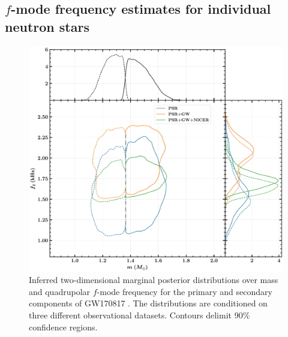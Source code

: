 \documentclass[aps,prd,twocolumn,superscriptaddress,footinbib]{revtex4-1}
\begin{document}
\subsection{$f$-mode frequency estimates for individual neutron stars}

\begin{figure}
    \centering
    \includegraphics[width=\linewidth]{Full_GR/GW170817_2D_posterior.pdf}%
    \caption{Inferred two-dimensional marginal posterior distributions over mass and quadrupolar $f$-mode frequency for the primary and secondary components of GW170817 \cite{GW170817}. The distributions are conditioned on three different observational datasets. Contours delimit 90\% confidence regions.}
    \label{fig:GW170817_GW190425_2D_posterior}
\end{figure}
\end{document}
